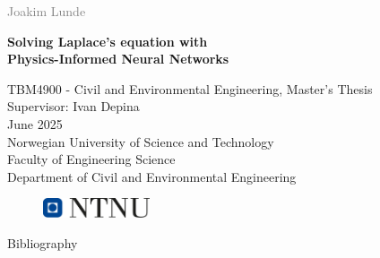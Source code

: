 \documentclass[a4paper, 12pt,twoside,fleqn]{book}
\begin{document}

\begin{titlepage}
  \vspace*{1.5cm}

  \noindent  \textcolor{gray}{\large Joakim Lunde} \\
  \vspace{1cm}

  \noindent \textbf{\LARGE Solving Laplace's equation with\\ Physics-Informed Neural Networks \\}

  \vfill  %

  \noindent TBM4900 - Civil and Environmental Engineering, Master's Thesis \\
  Supervisor: Ivan Depina \\
  June 2025 \\

  \vspace{0.8cm}
  \noindent
  Norwegian University of Science and Technology \\
  Faculty of Engineering Science \\
  Department of Civil and Environmental Engineering \\
  \vspace{0.8cm}

  \begin{figure}[h]
    \includegraphics[width=0.28\textwidth]{Figures/ntnu_basic.png}
  \end{figure}
\end{titlepage}





\tableofcontents
{}

\listoffigures
{}

\listoftables
{}

\printglossary[title=Glossary, toctitle=Glossary]


\cleardoublepage
{}
 


% 
% 
% 
% 
% 

{\protect\numberline{}Bibliography}
\chapter*{\bibname}
\printbibliography[heading=none]
\cleardoublepage

% 
\end{document}
